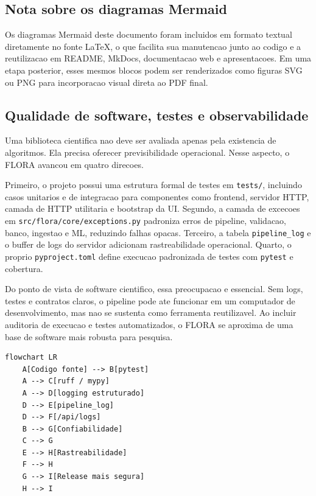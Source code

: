 \documentclass[12pt,a4paper]{article}
\begin{document}
\subsection{Nota sobre os diagramas Mermaid}

Os diagramas Mermaid deste documento foram incluidos em formato textual diretamente no fonte \LaTeX, o que facilita sua manutencao junto ao codigo e a reutilizacao em README, MkDocs, documentacao web e apresentacoes. Em uma etapa posterior, esses mesmos blocos podem ser renderizados como figuras SVG ou PNG para incorporacao visual direta ao PDF final.

\subsection{Qualidade de software, testes e observabilidade}

Uma biblioteca cientifica nao deve ser avaliada apenas pela existencia de algoritmos. Ela precisa oferecer previsibilidade operacional. Nesse aspecto, o FLORA avancou em quatro direcoes.

Primeiro, o projeto possui uma estrutura formal de testes em \texttt{tests/}, incluindo casos unitarios e de integracao para componentes como frontend, servidor HTTP, camada de HTTP utilitaria e bootstrap da UI. Segundo, a camada de excecoes em \texttt{src/flora/core/exceptions.py} padroniza erros de pipeline, validacao, banco, ingestao e ML, reduzindo falhas opacas. Terceiro, a tabela \texttt{pipeline\_log} e o buffer de logs do servidor adicionam rastreabilidade operacional. Quarto, o proprio \texttt{pyproject.toml} define execucao padronizada de testes com \texttt{pytest} e cobertura.

Do ponto de vista de software cientifico, essa preocupacao e essencial. Sem logs, testes e contratos claros, o pipeline pode ate funcionar em um computador de desenvolvimento, mas nao se sustenta como ferramenta reutilizavel. Ao incluir auditoria de execucao e testes automatizados, o FLORA se aproxima de uma base de software mais robusta para pesquisa.

\begin{lstlisting}[style=mermaid,caption={Diagrama Mermaid da camada de qualidade de software do FLORA.},label={lst:mermaid_quality}]
flowchart LR
    A[Codigo fonte] --> B[pytest]
    A --> C[ruff / mypy]
    A --> D[logging estruturado]
    D --> E[pipeline_log]
    D --> F[/api/logs]
    B --> G[Confiabilidade]
    C --> G
    E --> H[Rastreabilidade]
    F --> H
    G --> I[Release mais segura]
    H --> I
\end{lstlisting}
\end{document}
